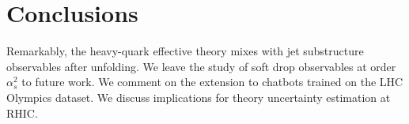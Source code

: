\section{Conclusions}\label{sec:conclusions}

Remarkably, the heavy-quark effective theory mixes with jet substructure
observables after unfolding. We leave the study of soft drop observables
at order $\alpha_s^2$ to future work. We comment on the extension to
chatbots trained on the LHC Olympics dataset. We discuss implications
for theory uncertainty estimation at RHIC.

